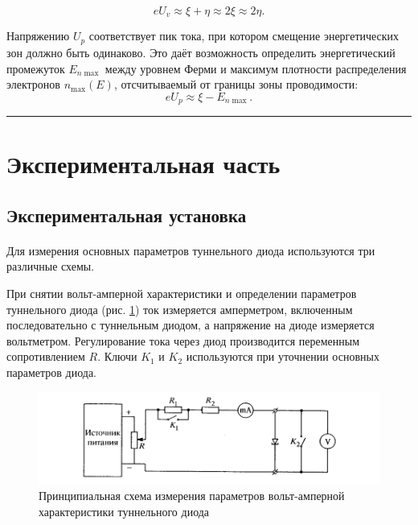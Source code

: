 \documentclass[a4paper,12pt]{article} %
\begin{document}
	\begin{equation}
		eU_v \approx \xi + \eta \approx 2\xi \approx 2\eta.
		\label{e:fermi}
	\end{equation}

	Напряжению $U_p$ соответствует пик тока, при котором смещение энергетических зон должно быть одинаково. Это даёт возможность определить энергетический промежуток $E_{n \max}$ между уровнем Ферми и максимум плотности распределения электронов $n_{\max}(E)$, отсчитываемый от границы зоны проводимости:
	\begin{equation}
		eU_p \approx \xi - E_{n\max}.
		\label{e:energ}
	\end{equation}

\medskip\hrule\medskip

\section{Экспериментальная часть}

\subsection{Экспериментальная установка}

\paragraph{}
	Для измерения основных параметров туннельного диода используются три различные схемы.
	
	При снятии вольт-амперной характеристики и определении параметров туннельного диода (рис. \ref{fig:setup_vac}) ток измеряется амперметром, включенным последовательно с туннельным диодом, а напряжение на диоде измеряется вольтметром. Регулирование тока через диод производится переменным сопротивлением $R$. Ключи $K_1$ и $K_2$ используются при уточнении основных параметров диода.

\begin{figure}[h]
\centering
\includegraphics[width=\textwidth]{setup_vac.png}
\caption{Принципиальная схема измерения параметров вольт-амперной характеристики туннельного диода}
\label{fig:setup_vac}
\end{figure}
\end{document}
